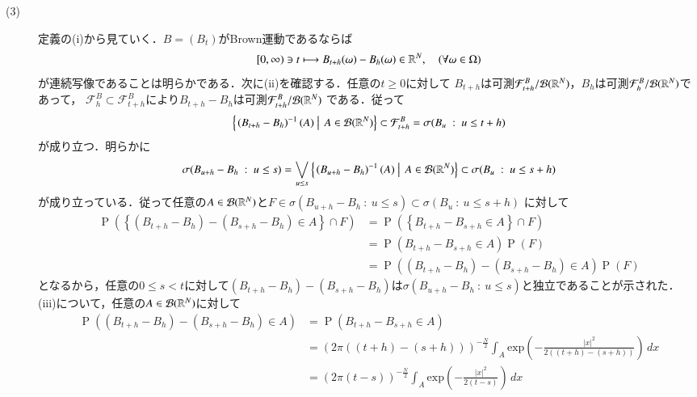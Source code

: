 \begin{prf}
\begin{description}
	\item[(3)] 定義の(i)から見ていく．$B = (B_t)$がBrown運動であるならば
		\begin{align}
			[0,\infty) \ni t \longmapsto B_{t+h}(\omega) - B_h(\omega) \in \mathbb{R}^N, \quad(\forall \omega \in \Omega)
		\end{align}
		が連続写像であることは明らかである．次に(ii)を確認する．任意の$t \geq 0$に対して
		$B_{t+h}$は可測$\mathcal{F}_{t+h}^B/\mathcal{B}(\mathbb{R}^N)$，$B_h$は可測$\mathcal{F}_h^B/\mathcal{B}(\mathbb{R}^N)$であって，
		$\mathcal{F}_{h}^B \subset \mathcal{F}_{t+h}^B$により$B_{t+h} - B_h$は可測$\mathcal{F}_{t+h}^B/\mathcal{B}(\mathbb{R}^N)$
		である．従って
		\begin{align}
			\left\{ \left. \left(B_{t+h} - B_h\right)^{-1}(A)\ \right|\ A \in \borel{\R^N} \right\}
			\subset \mathcal{F}_{t+h}^B = \sigma(B_{u}\ :\ u \leq t+h)
		\end{align}
		が成り立つ．明らかに
		\begin{align}
			\sigma(B_{u+h} - B_h\ :\ u \leq s)
			= \bigvee_{u \leq s} \left\{ \left. \left(B_{u+h} - B_h\right)^{-1}(A)\ \right|\ A \in \mathcal{B}(\mathbb{R}^N) \right\}
			\subset \sigma(B_{u}\ :\ u \leq s+h)
		\end{align}
		が成り立っている．従って任意の$A \in \mathcal{B}(\mathbb{R}^N)$と$F \in \sigma(B_{u+h} - B_h\ :\ u \leq s) \subset \sigma(B_{u}\ :\ u \leq s+h)$
		に対して
		\begin{align}
			\operatorname{P}\left( \left\{ (B_{t+h} - B_h) - (B_{s+h} - B_h) \in A \right\} \cap F \right)
			&= \operatorname{P}\left( \left\{ B_{t+h} - B_{s+h} \in A \right\} \cap F \right) \\
			&= \operatorname{P}\left( B_{t+h} - B_{s+h} \in A \right) \operatorname{P}(F) \\
			&= \operatorname{P}\left( (B_{t+h} - B_h) - (B_{s+h} - B_h) \in A \right) \operatorname{P}(F)
		\end{align}
		となるから，任意の$0 \leq s < t$に対して$(B_{t+h} - B_h) - (B_{s+h} - B_h)$は$\sigma(B_{u+h} - B_h\ :\ u \leq s)$と独立であることが示された．
		(iii)について，任意の$A \in \mathcal{B}(\mathbb{R}^N)$に対して
		\begin{align}
			\operatorname{P}\left( (B_{t+h} - B_h) - (B_{s+h} - B_h) \in A \right)
			&= \operatorname{P}\left( B_{t+h} - B_{s+h} \in A \right) \\
			&= (2\pi((t+h)-(s+h)))^{-\frac{N}{2}} \int_{A} \mathrm{exp}\left( -\frac{|x|^2}{2((t+h)-(s+h))} \right)\, dx \\
			&= (2\pi(t-s))^{-\frac{N}{2}} \int_{A} \mathrm{exp}\left( -\frac{|x|^2}{2(t-s)} \right)\, dx

\end{align}
\end{description}
\end{prf}
